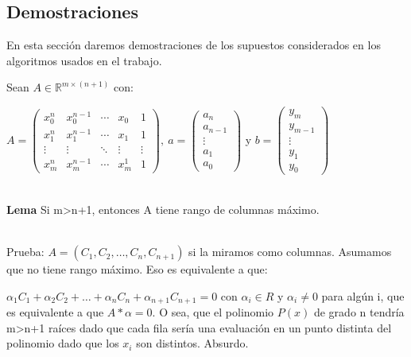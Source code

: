 \subsection{Demostraciones}

En esta sección daremos demostraciones de los supuestos considerados en los algoritmos usados en el
trabajo.

Sean $A \in \mathbb{R}^{m\times (n+1)}$ con:

\begin{center}
  $ A = \begin{pmatrix}
    x_0^n & x_0^{n-1} & \cdots &  x_0  & 1 \\
    x_1^{n} & x_1^{n-1} & \cdots & x_1 & 1 \\
    \vdots  & \vdots  & \ddots & \vdots  & \vdots \\
    x_m^{n} & x_m^{n-1} & \cdots & x_m^1 & 1
        \end{pmatrix}, \
   a = \begin{pmatrix}
        a_n \\
        a_{n-1} \\
        \vdots \\
        a_1 \\
        a_0
       \end{pmatrix}
  $ y $
  b = \begin{pmatrix}
        y_m \\
        y_{m-1} \\
        \vdots \\
        y_1 \\
        y_0
       \end{pmatrix}
  $
\end{center}


\ \\
\textbf{Lema} Si m>n+1, entonces A tiene rango de columnas máximo.

\ \\
Prueba:
  $A = ( C_1, C_2, \ldots, C_n, C_{n+1} )$ si la miramos como columnas. Asumamos que no tiene rango máximo. Eso es equivalente a que:

$\alpha_1C_1+\alpha_2C_2+\hdots+\alpha_nC_n+\alpha_{n+1}C_{n+1} = 0$ con $\alpha_i \in R$ y $\alpha_i
\neq 0$ para algún i, que es equivalente a que $A * \alpha =0$. O sea, que
el polinomio $P(x)$ de grado n tendría m>n+1 raíces dado que cada fila sería una evaluación en un punto distinta del polinomio dado que los $x_i$ son distintos. Absurdo.

